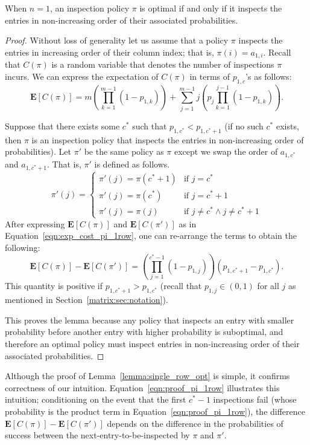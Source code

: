  \begin{lemma}\label{lemma:single_row_opt}
 When $n = 1$, an inspection policy $\pi$ is optimal if and only if it inspects the entries in non-increasing order of their associated probabilities.
 \end{lemma}
 \begin{proof}
 	Without loss of generality let us assume that a policy $\pi$ inspects the entries in increasing order of their column index; that is, $\pi(i) = a_{1,i}$. 
 	Recall that $C(\pi)$ is a random variable that denotes the number of inspections $\pi$ incurs. 
 	We can express the expectation of $C(\pi)$ in terms of $p_{1,c}$'s as follows:
 	\small
 	\begin{equation} \label{eqn:exp_cost_pi_1row}
 		\mathbf{E}\left[C(\pi)\right] = 
 		m \left(\prod_{k=1}^{m-1}(1 - p_{1,k})\right) + 
 		\sum_{j=1}^{m-1} j \left(p_j \prod_{k=1}^{j-1} (1-p_{1,k}) \right).
 	\end{equation}
 	\normalsize
	
 	Suppose that there exists some $c^*$ such that $p_{1,c^*} < p_{1,c^*+1}$ (if no such $c^*$ exists, then $\pi$ is an inspection policy that inspects the entries in non-increasing order of probabilities).
 	Let $\pi'$ be the same policy as $\pi$ except we swap the order of $a_{1,c^*}$ and $a_{1,c^*+1}$. 
 	That is, $\pi'$ is defined as follows.
 	\begin{equation*}
 		\pi'(j) = 
 		\begin{cases}
 			\pi'(j) = \pi(c^*+1)&  \mbox{if~} j = c^* \\
 			\pi'(j) = \pi(c^*)  &  \mbox{if~} j = c^*+1 \\
 			\pi'(j) = \pi(j)  &  \mbox{if~} j \neq c^* \land j \neq c^*+1
 		\end{cases}
 	\end{equation*}	
 	After expressing $\mathbf{E}[C(\pi)]$ and $\mathbf{E}[C(\pi')]$ as in Equation~\ref{eqn:exp_cost_pi_1row}, one can re-arrange the terms to obtain the following:
 	\begin{equation} \label{eqn:proof_pi_1row}
 	\mathbf{E}\left[C(\pi)\right] - \mathbf{E}\left[C(\pi')\right] = 
 	\left(\prod_{j=1}^{c^*-1} (1-p_{1,j})\right) (p_{1,c^*+1} - p_{1,c^*}).
 	\end{equation}
 	This quantity is positive if $p_{1,c^*+1} > p_{1,c^*}$ (recall that $p_{1,j} \in (0,1)$ for all $j$ as mentioned in Section~\ref{matrix:sec:notation}). 
	
 	This proves the lemma because any policy that inspects an entry with smaller probability before another entry with higher probability is suboptimal, and therefore an optimal policy must inspect entries in non-increasing order of their associated probabilities. 
 \end{proof}
 Although the proof of Lemma~\ref{lemma:single_row_opt} is simple, it confirms correctness of our intuition. Equation~\ref{eqn:proof_pi_1row} illustrates this intuition; conditioning on the event that the first $c^*-1$ inspections fail (whose probability is the product term in Equation~\ref{eqn:proof_pi_1row}), the difference $\mathbf{E}[C(\pi)] - \mathbf{E}[C(\pi')]$ depends on the difference in the probabilities of success between the next-entry-to-be-inspected by $\pi$ and $\pi'$.

